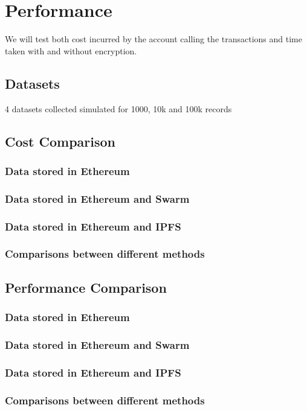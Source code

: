 \documentclass[11pt,openright]{report}
\begin{document}
\chapter{Performance}
\label{chapter:experiment_results}
We will test both cost incurred by the account calling the transactions and time taken with and without encryption.


\section{Datasets}
4 datasets
collected
simulated for 1000, 10k and 100k records

\section{Cost Comparison}
\subsection{Data stored in Ethereum}
\subsection{Data stored in Ethereum and Swarm}
\subsection{Data stored in Ethereum and IPFS}
\subsection{Comparisons between different methods}

\section{Performance Comparison}
\subsection{Data stored in Ethereum}
\subsection{Data stored in Ethereum and Swarm}
\subsection{Data stored in Ethereum and IPFS}
\subsection{Comparisons between different methods}
\end{document}
